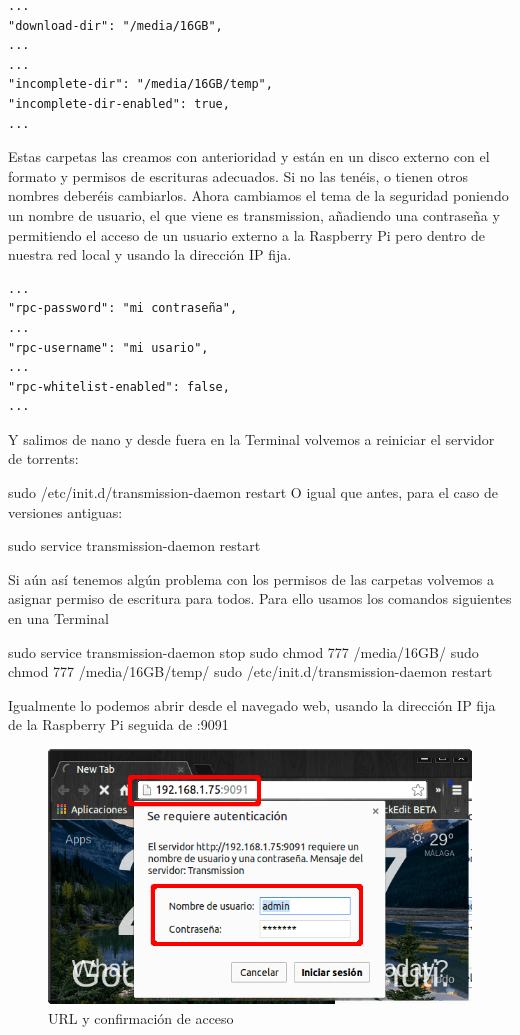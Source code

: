 \documentclass{article}
\begin{document}
\begin{lstlisting}[frame=single,framesep=7pt]
...
"download-dir": "/media/16GB",
...
...
"incomplete-dir": "/media/16GB/temp",
"incomplete-dir-enabled": true,
...
\end{lstlisting}

Estas carpetas las creamos con anterioridad y están en un disco externo con el formato y permisos de escrituras adecuados. Si no las tenéis, o tienen otros nombres deberéis cambiarlos. Ahora cambiamos el tema de la seguridad poniendo un nombre de usuario, el que viene es transmission, añadiendo una contraseña y permitiendo el acceso de un usuario externo a la Raspberry Pi pero dentro de nuestra red local y usando la dirección IP fija.

\begin{lstlisting}[frame=single,framesep=7pt]
...
"rpc-password": "mi contraseña",
...
"rpc-username": "mi usario",
...
"rpc-whitelist-enabled": false,
...
\end{lstlisting}

Y salimos de nano y desde fuera en la Terminal volvemos a reiniciar el servidor de torrents:

sudo /etc/init.d/transmission-daemon restart
O igual que antes, para el caso de versiones antiguas:

sudo service transmission-daemon restart

Si aún así tenemos algún problema con los permisos de las carpetas volvemos a asignar permiso de escritura para todos. Para ello usamos los comandos siguientes en una Terminal

sudo service transmission-daemon stop
sudo chmod 777 /media/16GB/
sudo chmod 777 /media/16GB/temp/
sudo /etc/init.d/transmission-daemon restart

Igualmente lo podemos abrir desde el navegado web, usando la dirección IP fija de la Raspberry Pi seguida de :9091

\begin{figure}[h!]
\centering
\includegraphics[scale=0.5]{torrent19.png}
\caption{URL y confirmación de acceso}
\label{fig:torrent1}
\end{figure}
\end{document}
